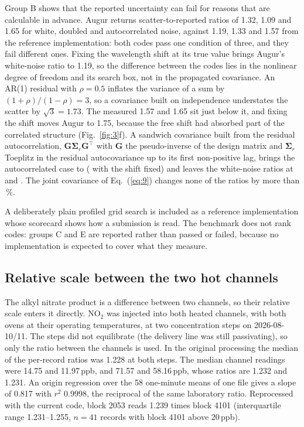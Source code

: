 Group B shows that the reported uncertainty can fail for reasons that are calculable in advance. Augur returns
scatter-to-reported ratios of 1.32, 1.09 and 1.65 for white, doubled and autocorrelated noise, against 1.19, 1.33 and
1.57 from the reference implementation: both codes pass one condition of three, and they fail different ones. Fixing
the wavelength shift at its true value brings Augur's white-noise ratio to 1.19, so the difference between the codes lies
in the nonlinear degree of freedom and its search box, not in the propagated covariance. An AR(1) residual with
$\rho = 0.5$ inflates the variance of a sum by $(1+\rho)/(1-\rho) = 3$, so a covariance built on independence understates
the scatter by $\sqrt{3} = 1.73$. The measured 1.57 and 1.65 sit just below it, and fixing the shift moves Augur to 1.75,
because the free shift had absorbed part of the correlated structure (Fig.~\ref{fig:3}f). A sandwich covariance built
from the residual autocorrelation, $\mathbf{G}\boldsymbol{\Sigma}_r\mathbf{G}^{\top}$ with $\mathbf{G}$ the pseudo-inverse of the
design matrix and $\boldsymbol{\Sigma}_r$ Toeplitz in the residual autocovariance up to its first non-positive lag, brings the
autocorrelated case to  ( with the shift fixed) and leaves the white-noise ratios at  and
. The joint covariance of Eq.~(\ref{eq:9}) changes none of the ratios by more than \,\%.

A deliberately plain profiled grid search is included as a reference implementation whose scorecard shows how a
submission is read. The benchmark does not rank codes: groups C and E are reported rather than passed or failed,
because no implementation is expected to cover what they measure.

\subsection{Relative scale between the two hot channels}
\label{sec:3.5}

The alkyl nitrate product is a difference between two channels, so their relative scale enters it directly. NO$_2$
was injected into both heated channels, with both ovens at their operating temperatures, at two concentration steps
on 2026-08-10/11. The steps did not equilibrate (the delivery line was still passivating), so only the ratio between
the channels is used. In the original processing the median of the per-record ratios was 1.228 at both steps. The median channel readings
were 14.75 and 11.97\,ppb, and 71.57 and 58.16\,ppb, whose ratios are 1.232 and 1.231. An origin regression over the 58
one-minute means of one file gives a slope of 0.817 with $r^2$ 0.9998, the reciprocal of the same laboratory ratio.
Reprocessed with the current code, block 2053 reads 1.239 times block 4101 (interquartile range 1.231--1.255, $n = 41$
records with block 4101 above 20\,ppb).

